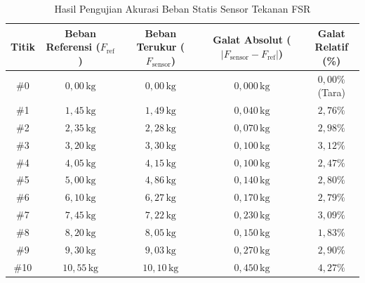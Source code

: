 \begin{table}[htbp]
\centering
\caption{Hasil Pengujian Akurasi Beban Statis Sensor Tekanan FSR}
\label{tab:test02_fsr_accuracy}
\small
\setlength{\tabcolsep}{6pt}
\begin{tabular}{|c|c|c|c|c|}
\hline
\textbf{Titik} & \shortstack{\textbf{Beban Referensi} \\ \textbf{($F_{\mathrm{ref}}$)}} & \shortstack{\textbf{Beban Terukur} \\ \textbf{($F_{\mathrm{sensor}}$)}} & \shortstack{\textbf{Galat Absolut} \\ \textbf{($|F_{\mathrm{sensor}} - F_{\mathrm{ref}}|$)}} & \shortstack{\textbf{Galat Relatif} \\ \textbf{(\%)}} \\ \hline
\#0 & $0{,}00\,\mathrm{kg}$ & $0{,}00\,\mathrm{kg}$ & $0{,}000\,\mathrm{kg}$ & $0{,}00\%$ (Tara) \\ \hline
\#1 & $1{,}45\,\mathrm{kg}$ & $1{,}49\,\mathrm{kg}$ & $0{,}040\,\mathrm{kg}$ & $2{,}76\%$ \\ \hline
\#2 & $2{,}35\,\mathrm{kg}$ & $2{,}28\,\mathrm{kg}$ & $0{,}070\,\mathrm{kg}$ & $2{,}98\%$ \\ \hline
\#3 & $3{,}20\,\mathrm{kg}$ & $3{,}30\,\mathrm{kg}$ & $0{,}100\,\mathrm{kg}$ & $3{,}12\%$ \\ \hline
\#4 & $4{,}05\,\mathrm{kg}$ & $4{,}15\,\mathrm{kg}$ & $0{,}100\,\mathrm{kg}$ & $2{,}47\%$ \\ \hline
\#5 & $5{,}00\,\mathrm{kg}$ & $4{,}86\,\mathrm{kg}$ & $0{,}140\,\mathrm{kg}$ & $2{,}80\%$ \\ \hline
\#6 & $6{,}10\,\mathrm{kg}$ & $6{,}27\,\mathrm{kg}$ & $0{,}170\,\mathrm{kg}$ & $2{,}79\%$ \\ \hline
\#7 & $7{,}45\,\mathrm{kg}$ & $7{,}22\,\mathrm{kg}$ & $0{,}230\,\mathrm{kg}$ & $3{,}09\%$ \\ \hline
\#8 & $8{,}20\,\mathrm{kg}$ & $8{,}05\,\mathrm{kg}$ & $0{,}150\,\mathrm{kg}$ & $1{,}83\%$ \\ \hline
\#9 & $9{,}30\,\mathrm{kg}$ & $9{,}03\,\mathrm{kg}$ & $0{,}270\,\mathrm{kg}$ & $2{,}90\%$ \\ \hline
\#10 & $10{,}55\,\mathrm{kg}$ & $10{,}10\,\mathrm{kg}$ & $0{,}450\,\mathrm{kg}$ & $4{,}27\%$ \\ \hline
\end{tabular}
\end{table}

